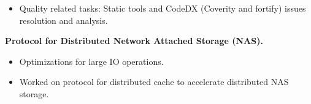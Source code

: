\begin{itemize}
\begin{itemize}
	 \item Quality related tasks: Static tools and CodeDX (Coverity and fortify) issues resolution and analysis.\\[-0.5cm]
	\end{itemize}
	\textbf{Protocol for Distributed Network Attached Storage (NAS).}
	\begin{itemize}
	\item Optimizations for large IO operations.
	\item Worked on protocol for distributed cache to accelerate distributed NAS storage.
	\end{itemize}
\end{itemize}
